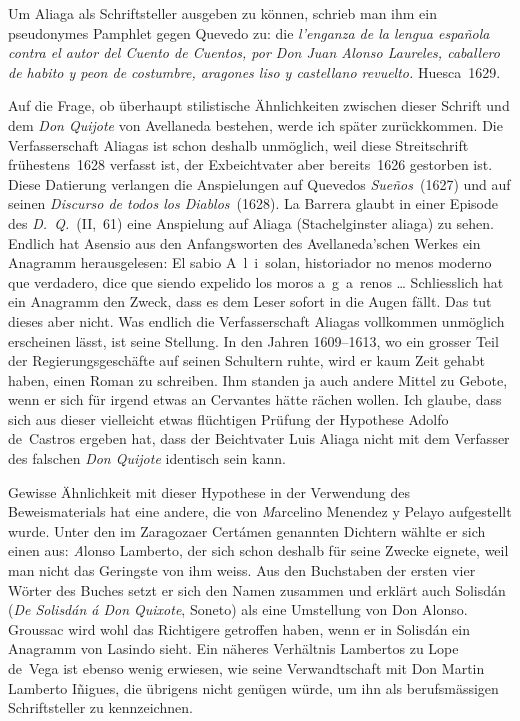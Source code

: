 Um Aliaga als Schriftsteller ausgeben zu können, schrieb man ihm
ein pseudonymes Pamphlet gegen Quevedo zu: die {\it l'enganza de la lengua
española contra el autor del Cuento de Cuentos, por Don Juan Alonso
Laureles, caballero de habito y peon de costumbre, aragones liso y
castellano revuelto.} Huesca~1629.

Auf die Frage, ob überhaupt stilistische Ähnlichkeiten zwischen
dieser Schrift und dem {\it Don Quijote} von Avellaneda bestehen, werde
ich später zurückkommen. Die Verfasserschaft Aliagas ist schon deshalb
unmöglich, weil diese Streitschrift frühestens~1628 verfasst ist,
der Exbeichtvater aber bereits~1626 gestorben ist. Diese Datierung verlangen
die Anspielungen auf Quevedos {\it Sueños}~(1627) und auf seinen
{\it Discurso de todos los Diablos}~(1628).
La Barrera glaubt in einer Episode des
{\it D.~Q.}\ (II,~61) eine Anspielung auf Aliaga (Stachelginster \longeq aliaga) zu
sehen. Endlich hat Asensio aus den Anfangsworten des Avellaneda'schen
Werkes ein Anagramm herausgelesen: {\itquoted El sabio A~l~i~solan, historiador
no menos moderno que verdadero, dice que siendo expelido los moros
a~g~a~renos \dots} Schliesslich hat ein Anagramm den Zweck, dass es dem
Leser sofort in die Augen fällt. Das tut dieses aber nicht. Was endlich
die Verfasserschaft Aliagas vollkommen unmöglich erscheinen lässt, ist
seine Stellung. In den Jahren 1609--1613, wo ein grosser Teil der
Regierungsgeschäfte auf seinen Schultern ruhte, wird er kaum Zeit gehabt
haben, einen Roman zu schreiben. Ihm standen ja auch andere Mittel
zu Gebote, wenn er sich für irgend etwas an Cervantes hätte rächen
wollen. Ich glaube, dass sich aus dieser vielleicht etwas flüchtigen Prüfung
der Hypothese Adolfo de~Castros ergeben hat, dass der Beichtvater Luis
Aliaga nicht mit dem Verfasser des falschen {\it Don Quijote} identisch
sein kann.

Gewisse Ähnlichkeit mit dieser Hypothese in der Verwendung des
Beweismaterials hat eine andere, die von {\emph Marcelino Menendez y
Pelayo} aufgestellt wurde.
Unter den im Zaragozaer Certámen genannten Dichtern wählte er sich einen aus:
{\emph Alonso Lamberto}, der
sich schon deshalb für seine Zwecke eignete, weil man nicht das Geringste
von ihm weiss. Aus den Buchstaben der ersten vier Wörter des Buches
setzt er sich den Namen zusammen und erklärt auch Solisdán ({\it De Solisdán
á Don Quixote}, Soneto) als eine Umstellung von Don Alonso. Groussac
wird wohl das Richtigere getroffen haben, wenn er in Solisdán ein
Anagramm von Lasindo
sieht. Ein näheres Verhältnis Lambertos zu Lope
de~Vega ist ebenso wenig erwiesen, wie seine Verwandtschaft mit Don
Martin Lamberto Iñigues, die übrigens nicht genügen würde, um ihn als
berufsmässigen Schriftsteller zu kennzeichnen.

